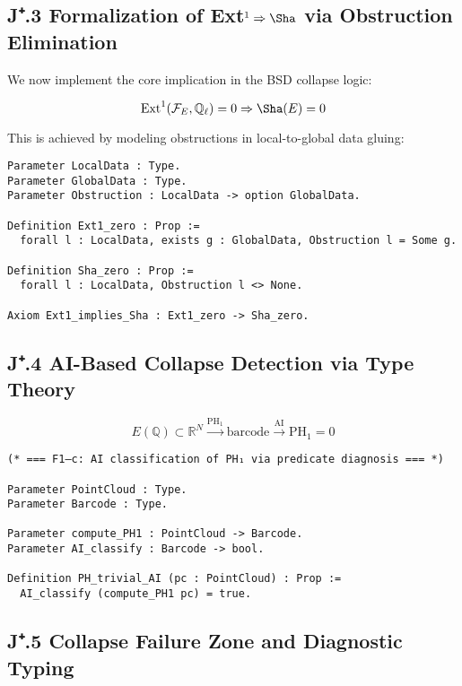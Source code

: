 \subsection*{J⁺.3 Formalization of Ext${}^1 \Rightarrow \Sha$ via Obstruction Elimination}

We now implement the core implication in the BSD collapse logic:

\[
\mathrm{Ext}^1(\mathcal{F}_E, \mathbb{Q}_\ell) = 0 \Rightarrow \Sha(E) = 0
\]

This is achieved by modeling obstructions in local-to-global data gluing:

\begin{lstlisting}[language=Coq, caption=Ext^1-to-Sha Implication in Coq]
Parameter LocalData : Type.
Parameter GlobalData : Type.
Parameter Obstruction : LocalData -> option GlobalData.

Definition Ext1_zero : Prop :=
  forall l : LocalData, exists g : GlobalData, Obstruction l = Some g.

Definition Sha_zero : Prop :=
  forall l : LocalData, Obstruction l <> None.

Axiom Ext1_implies_Sha : Ext1_zero -> Sha_zero.
\end{lstlisting}

\subsection*{J⁺.4 AI-Based Collapse Detection via Type Theory}

\[
E(\mathbb{Q}) \subset \mathbb{R}^N \xrightarrow{\mathrm{PH}_1} \text{barcode} \xrightarrow{\text{AI}} \mathrm{PH}_1 = 0
\]

\begin{lstlisting}[language=Coq, caption=PH₁ Diagnosis via AI Classifier]
(* === F1–c: AI classification of PH₁ via predicate diagnosis === *)

Parameter PointCloud : Type.
Parameter Barcode : Type.

Parameter compute_PH1 : PointCloud -> Barcode.
Parameter AI_classify : Barcode -> bool.

Definition PH_trivial_AI (pc : PointCloud) : Prop :=
  AI_classify (compute_PH1 pc) = true.
\end{lstlisting}

\subsection*{J⁺.5 Collapse Failure Zone and Diagnostic Typing}

